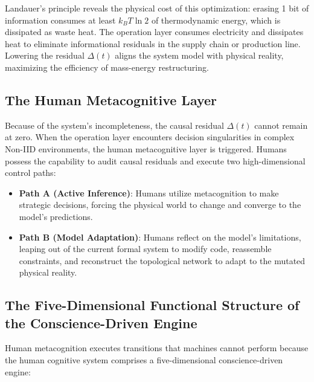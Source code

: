 \documentclass[11pt,a4paper]{article}
\begin{document}
Landauer's principle reveals the physical cost of this optimization: erasing 1 bit of information consumes at least $k_B T \ln 2$ of thermodynamic energy, which is dissipated as waste heat. The operation layer consumes electricity and dissipates heat to eliminate informational residuals in the supply chain or production line. Lowering the residual $\Delta(t)$ aligns the system model with physical reality, maximizing the efficiency of mass-energy restructuring.

\subsection{The Human Metacognitive Layer}
Because of the system's incompleteness, the causal residual $\Delta(t)$ cannot remain at zero. When the operation layer encounters decision singularities in complex Non-IID environments, the human metacognitive layer is triggered. Humans possess the capability to audit causal residuals and execute two high-dimensional control paths:
\begin{itemize}
    \item \textbf{Path A (Active Inference)}: Humans utilize metacognition to make strategic decisions, forcing the physical world to change and converge to the model's predictions.
    \item \textbf{Path B (Model Adaptation)}: Humans reflect on the model's limitations, leaping out of the current formal system to modify code, reassemble constraints, and reconstruct the topological network to adapt to the mutated physical reality.
\end{itemize}

\subsection{The Five-Dimensional Functional Structure of the Conscience-Driven Engine}
Human metacognition executes transitions that machines cannot perform because the human cognitive system comprises a five-dimensional conscience-driven engine:
\end{document}
